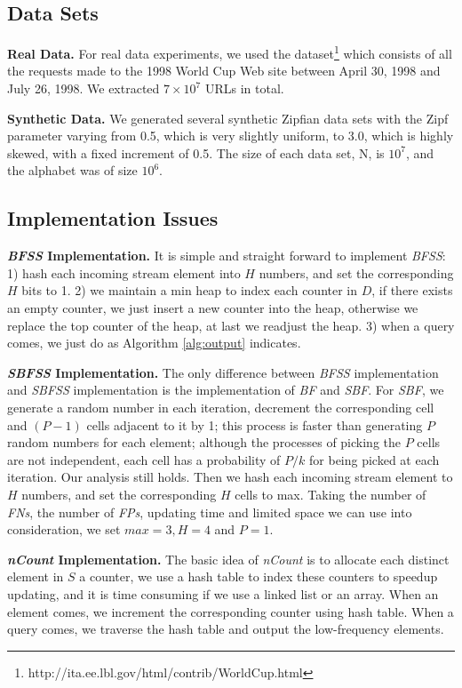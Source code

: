 \documentclass[conference]{IEEEtran}
\begin{document}
\subsection{Data Sets}
\textbf{Real Data.} For real data experiments, we used the dataset\footnote{http://ita.ee.lbl.gov/html/contrib/WorldCup.html} which consists of all the requests made to the 1998 World Cup Web site between April 30, 1998 and July 26, 1998. We extracted $7\times10^7$ URLs in total.\par
\textbf{Synthetic Data.} We generated several synthetic Zipﬁan data sets with the Zipf parameter varying from 0.5, which is very slightly uniform, to 3.0, which is highly skewed, with a fixed increment of 0.5. The size of each data set, N, is $10^7$, and the alphabet was of size $10^6$.
\subsection{Implementation Issues}
\textbf{\emph{BFSS} Implementation.} It is simple and straight forward to implement \emph{BFSS}: 1) hash each incoming stream element into $H$ numbers, and set the corresponding $H$ bits to 1. 2) we maintain a min heap to index each counter in $D$, if there exists an empty counter, we just insert a new counter into the heap, otherwise we replace the top counter of the heap, at last we readjust the heap. 3) when a query comes, we just do as Algorithm \ref{alg:output} indicates.\par

\textbf{\emph{SBFSS} Implementation.} The only difference between \emph{BFSS} implementation and \emph{SBFSS} implementation is the implementation of \emph{BF} and \emph{SBF}. For \emph{SBF}, we generate a random number in each iteration, decrement the corresponding cell and $(P-1)$ cells adjacent to it by 1; this process is faster than generating $P$ random numbers for each element; although the processes of picking the $P$ cells are not independent, each cell has a probability of $P/k$ for being picked at each iteration. Our analysis still holds. Then we hash each incoming stream element to $H$ numbers, and set the corresponding $H$ cells to max. Taking the number of \emph{FNs}, the number of \emph{FPs}, updating time and limited space we can use into consideration, we set $max=3, H=4$ and $P=1$.\par

\textbf{\emph{nCount} Implementation.} The basic idea of \emph{nCount} is to allocate each distinct element in $S$ a counter, we use a hash table to index these counters to speedup updating, and it is time consuming if we use a linked list or an array. When an element comes, we increment the corresponding counter using hash table. When a query comes, we traverse the hash table and output the low-frequency elements. \par
\end{document}
